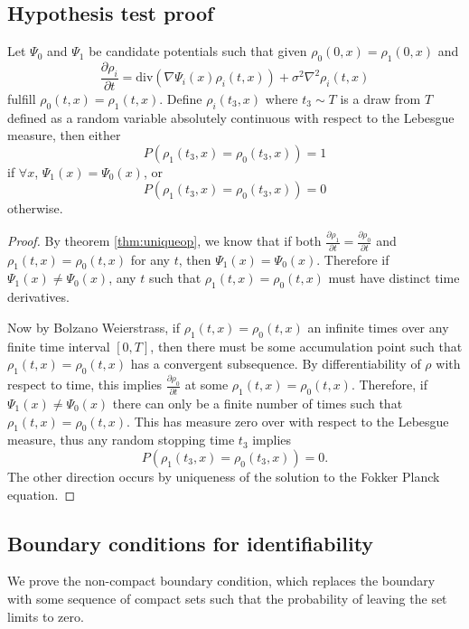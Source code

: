 \documentclass{article}
\begin{document}
\subsection{Hypothesis test proof}\label{sec:hypo}
\begin{cor}
Let $\Psi_0$ and $\Psi_1$ be candidate potentials such that given $\rho_0(0,x)=\rho_1(0,x)$ and
\[\frac{\partial \rho_i}{\partial t} = \text{div}(\nabla \Psi_i(x) \rho_i(t,x)) + \sigma^2\nabla^2 \rho_i(t,x)\]
fulfill $\rho_0(t,x) = \rho_1(t,x)$. Define $\rho_i(t_3,x)$ where $t_3 \sim T$ is a draw from $T$ defined as a random variable absolutely continuous with respect to the Lebesgue measure, then either
\[P(\rho_1(t_3,x) = \rho_0(t_3,x))=1\]
if $\forall x$, $\Psi_1(x)=\Psi_0(x)$, or
\[P(\rho_1(t_3,x) = \rho_0(t_3,x))=0\]
otherwise.
\end{cor}
\begin{proof}
By theorem \ref{thm:uniqueop}, we know that if both $\frac{\partial\rho_1}{\partial t} = \frac{\partial\rho_0}{\partial t}$ and $\rho_1(t,x) = \rho_0(t,x)$ for any $t$, then $\Psi_1(x)=\Psi_0(x)$. Therefore if $\Psi_1(x) \neq \Psi_0(x)$, any $t$ such that $\rho_1(t,x)=\rho_0(t,x)$ must have distinct time derivatives.

Now by Bolzano Weierstrass, if $\rho_1(t,x)=\rho_0(t,x)$ an infinite times over any finite time interval $[0,T]$, then there must be some accumulation point such that $\rho_1(t,x)=\rho_0(t,x)$ has a convergent subsequence. By differentiability of $\rho$ with respect to time, this implies $\frac{\partial\rho_0}{\partial t}$ at some $\rho_1(t,x)=\rho_0(t,x)$. Therefore, if $\Psi_1(x) \neq \Psi_0(x)$ there can only be a finite number of times such that $\rho_1(t,x) = \rho_0(t,x)$. This has measure zero over with respect to the Lebesgue measure, thus any random stopping time $t_3$ implies
\[P(\rho_1(t_3,x) = \rho_0(t_3,x))=0.\]
The other direction occurs by uniqueness of the solution to the Fokker Planck equation.


\end{proof}

\subsection{Boundary conditions for identifiability}
\label{sec:uniqueop2}


We prove the non-compact boundary condition, which replaces the boundary with some sequence of compact sets such that the probability of leaving the set limits to zero.
\end{document}
